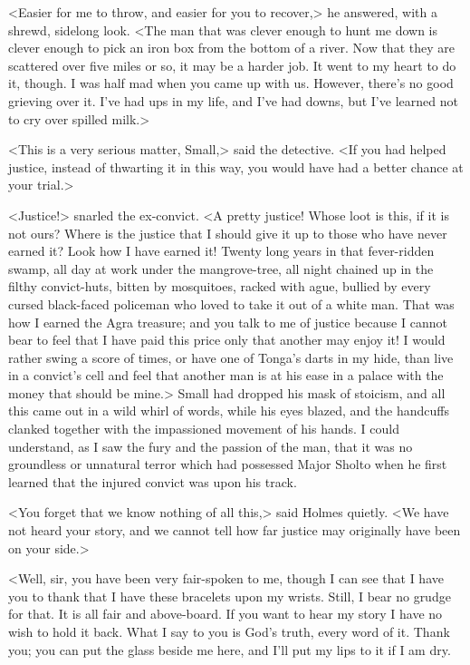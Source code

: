 <Easier for me to throw, and easier for you to recover,> he answered, with a shrewd, sidelong look. <The man that was clever enough to hunt me down is clever enough to pick an iron box from the bottom of a river. Now that they are scattered over five miles or so, it may be a harder job. It went to my heart to do it, though. I was half mad when you came up with us. However, there's no good grieving over it. I've had ups in my life, and I've had downs, but I've learned not to cry over spilled milk.>

<This is a very serious matter, Small,> said the detective. <If you had helped justice, instead of thwarting it in this way, you would have had a better chance at your trial.>

<Justice!> snarled the ex-convict. <A pretty justice! Whose loot is this, if it is not ours? Where is the justice that I should give it up to those who have never earned it? Look how I have earned it! Twenty long years in that fever-ridden swamp, all day at work under the mangrove-tree, all night chained up in the filthy convict-huts, bitten by mosquitoes, racked with ague, bullied by every cursed black-faced policeman who loved to take it out of a white man. That was how I earned the Agra treasure; and you talk to me of justice because I cannot bear to feel that I have paid this price only that another may enjoy it! I would rather swing a score of times, or have one of Tonga's darts in my hide, than live in a convict's cell and feel that another man is at his ease in a palace with the money that should be mine.> Small had dropped his mask of stoicism, and all this came out in a wild whirl of words, while his eyes blazed, and the handcuffs clanked together with the impassioned movement of his hands. I could understand, as I saw the fury and the passion of the man, that it was no groundless or unnatural terror which had possessed Major Sholto when he first learned that the injured convict was upon his track.

<You forget that we know nothing of all this,> said Holmes quietly. <We have not heard your story, and we cannot tell how far justice may originally have been on your side.>

<Well, sir, you have been very fair-spoken to me, though I can see that I have you to thank that I have these bracelets upon my wrists. Still, I bear no grudge for that. It is all fair and above-board. If you want to hear my story I have no wish to hold it back. What I say to you is God's truth, every word of it. Thank you; you can put the glass beside me here, and I'll put my lips to it if I am dry.

